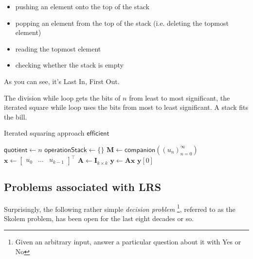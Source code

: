 \documentclass[10.8pt,oneside,reqno]{article}
\begin{document}
\begin{itemize}
    \item pushing an element onto the top of the stack
    \item popping an element from the top of the stack (i.e. deleting the topmost element)
    \item reading the topmost element
    \item checking whether the stack is empty
\end{itemize}

As you can see, it’s Last In, First Out. 

The division while loop gets the bits of $n$ from least to most significant, the iterated square while loop uses the bits from most to least significant. A stack fits the bill. 

\begin{algorithm}
    \label{algo:3}
    \caption{Iterated squaring approach $\mathsf{efficient}$}
    \SetAlgoLined
    \DontPrintSemicolon
    $\mathsf{quotient} \gets n$\;
    $\mathsf{operationStack} \gets \{ \}$\;
    $\mathbf{M} \gets \mathsf{companion}(( u_n )_{n=0} ^{\infty})$\;
    $ \mathbf{x} \gets \begin{bmatrix} u_0 & \dots & u_{k-1} \end{bmatrix}^{\intercal}$\;
    $ \mathbf{A} \gets \mathbf{I}_{k \times k}$\;
    $\mathbf{y} \gets \mathbf{Ax}$\;
    \Return $\mathbf{y}[0]$\;

\end{algorithm}

\subsection{Problems associated with LRS}
Surprisingly, the following rather simple \textit{decision problem} \footnote{Given an arbitrary input, answer a particular question about it with Yes or No}, referred to as the Skolem problem, has been open for the last eight decades or so.
\end{document}
